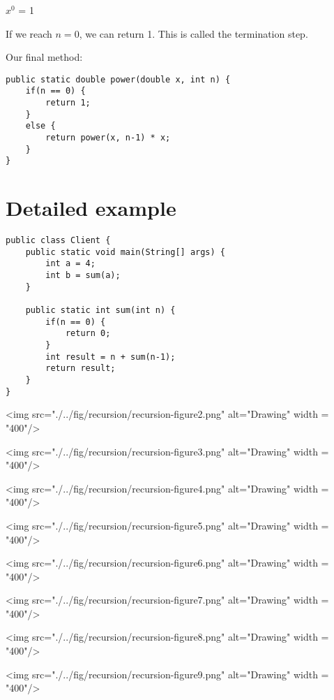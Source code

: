 \begin{center}
\huge{$x^0$ = 1}
\end{center}
\normalsize

If we reach $n=0$, we can return 1.
This is called the termination step.

Our final method:

\begin{lstlisting}
public static double power(double x, int n) {
	if(n == 0) {
		return 1;
	}
	else {
		return power(x, n-1) * x;
	}
}
\end{lstlisting}

\section{Detailed example}

\begin{lstlisting}
public class Client {
	public static void main(String[] args) {
		int a = 4;
		int b = sum(a);
	}
	
	public static int sum(int n) {
		if(n == 0) {
			return 0;
		}
		int result = n + sum(n-1);
		return result;
	}
}
\end{lstlisting}

\newpage

<img src="./../fig/recursion/recursion-figure2.png" alt="Drawing" width = "400"/>
\vskip0.6cm

<img src="./../fig/recursion/recursion-figure3.png" alt="Drawing" width = "400"/>

\vskip0.6cm

<img src="./../fig/recursion/recursion-figure4.png" alt="Drawing" width = "400"/>

\vskip0.6cm

<img src="./../fig/recursion/recursion-figure5.png" alt="Drawing" width = "400"/>

\vskip0.6cm

<img src="./../fig/recursion/recursion-figure6.png" alt="Drawing" width = "400"/>

\vskip0.6cm

<img src="./../fig/recursion/recursion-figure7.png" alt="Drawing" width = "400"/>

\vskip0.6cm

<img src="./../fig/recursion/recursion-figure8.png" alt="Drawing" width = "400"/>

\vskip0.6cm

<img src="./../fig/recursion/recursion-figure9.png" alt="Drawing" width = "400"/>

